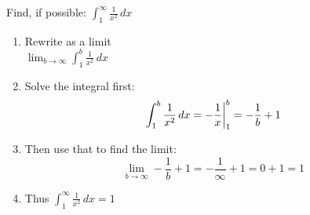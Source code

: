 \documentclass[12pt]{article}
\begin{document}
Find, if possible: $ \int_{1}^{\infty} \frac{1}{x^2} \,dx $

\begin{enumerate}

    \item Rewrite as a limit \\ $\lim_{b\to\infty} \int_{1}^{b} \frac{1}{x^2} \,dx$

    \item Solve the integral first: \\
    \begin{equation*}
        \int_{1}^{b} \frac{1}{x^2} \,dx \\ 
        = -\frac{1}{x} \bigg\rvert_{1}^{b} \\
        = -\frac{1}{b} + 1 
    \end{equation*}

    \item Then use that to find the limit: \\
    \begin{equation*}
        \lim_{b\to\infty} -\frac{1}{b} + 1 = -\frac{1}{\infty} + 1 = 0 + 1 = 1
    \end{equation*}

    \item Thus $ \int_{1}^{\infty} \frac{1}{x^2} \,dx = 1 $

\end{enumerate}
\end{document}
